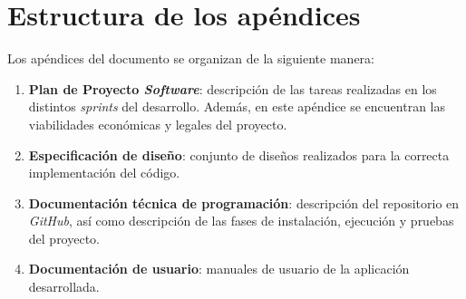 \section{Estructura de los apéndices}
Los apéndices del documento se organizan de la siguiente manera:
\begin{enumerate}
	\item \textbf{Plan de Proyecto \textit{Software}}: descripción de las tareas realizadas en los distintos \textit{sprints} del desarrollo. Además, en este apéndice se encuentran las viabilidades económicas y legales del proyecto.
	\item \textbf{Especificación de diseño}: conjunto de diseños realizados para la correcta implementación del código.
	\item \textbf{Documentación técnica de programación}: descripción del repositorio en \textit{GitHub}, así como descripción de las fases de instalación, ejecución y pruebas del proyecto.
	\item \textbf{Documentación de usuario}: manuales de usuario de la aplicación desarrollada.
\end{enumerate}

